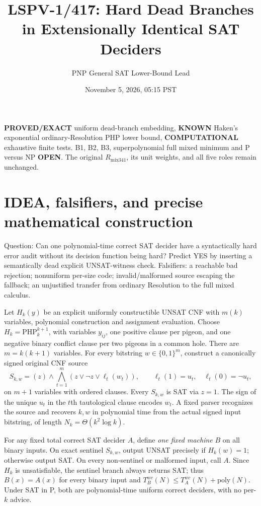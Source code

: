 \documentclass[11pt]{article}
\title{LSPV-1/417: Hard Dead Branches in Extensionally Identical SAT Deciders}
\author{PNP General SAT Lower-Bound Lead}\date{November 5, 2026, 05:15 PST}
\begin{document}
\maketitle
\noindent\textbf{PROVED/EXACT} uniform dead-branch embedding, \textbf{KNOWN} Haken's exponential ordinary-Resolution PHP lower bound, \textbf{COMPUTATIONAL} exhaustive finite tests. B1, B2, B3, superpolynomial full mixed minimum and P versus NP \textbf{OPEN}. The original \(R_{\mathrm{mix341}}\), its unit weights, and all five roles remain unchanged.

\section*{IDEA, falsifiers, and precise mathematical construction}
Question: Can one polynomial-time correct SAT decider have a syntactically hard error audit without its decision function being hard? Predict YES by inserting a semantically dead explicit UNSAT-witness check. Falsifiers: a reachable bad rejection; nonuniform per-size code; invalid/malformed source escaping the fallback; an unjustified transfer from ordinary Resolution to the full mixed calculus.

Let \(H_k(y)\) be an explicit uniformly constructible UNSAT CNF with \(m(k)\) variables, polynomial construction and assignment evaluation. Choose \(H_k=\mathrm{PHP}^{k+1}_{k}\), with variables \(y_{ij}\), one positive clause per pigeon, and one negative binary conflict clause per two pigeons in a common hole. There are \(m=k(k+1)\) variables. For every bitstring \(w\in\{0,1\}^m\), construct a canonically signed original CNF source
\[
S_{k,w}=(z)\land\bigwedge_{t=1}^m (z\lor\neg z\lor\ell_t(w_t)), \qquad
\ell_t(1)=u_t,\quad\ell_t(0)=\neg u_t,
\]
on \(m+1\) variables with ordered clauses. Every \(S_{k,w}\) is SAT via \(z=1\). The sign of the unique \(u_t\) in the \(t\)th tautological clause encodes \(w_t\). A fixed parser recognizes the source and recovers \(k,w\) in polynomial time from the actual signed input bitstring, of length \(N_k=\Theta(k^2\log k)\).

For any fixed total correct SAT decider \(A\), define \emph{one fixed machine} \(B\) on all binary inputs. On exact sentinel \(S_{k,w}\), output UNSAT precisely if \(H_k(w)=1\); otherwise output SAT. On every non-sentinel or malformed input, call \(A\). Since \(H_k\) is unsatisfiable, the sentinel branch always returns SAT; thus \(B(x)=A(x)\) for every binary input and \(T_B^{wc}(N)\le T_A^{wc}(N)+\mathrm{poly}(N)\). Under SAT in P, both are polynomial-time uniform correct deciders, with no per-\(k\) advice.
\end{document}
